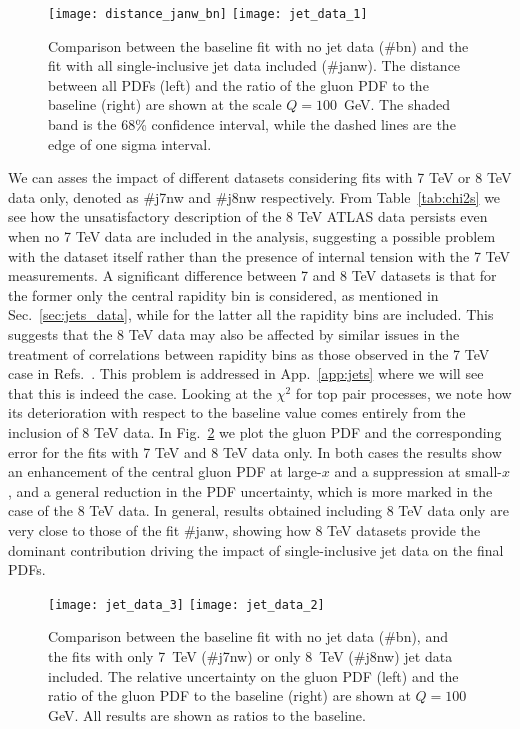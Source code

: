 \begin{figure}[!t]
    \centering
    \texttt{[image: distance\_janw\_bn]}
    \texttt{[image: jet\_data\_1]}\\
    \caption{ Comparison between the baseline fit with no jet data  (\#bn)
      and the fit with all single-inclusive jet data included (\#janw).
      The distance between all PDFs
      (left) and the ratio of the gluon PDF to the baseline (right) are shown at the scale
      $Q=100$~GeV. The shaded band is the 68\% confidence interval,
      while the dashed lines are the edge of one sigma interval.}
    \label{fig:jet_data_total}
\end{figure}

%
We can asses the impact of different datasets considering fits with 7 TeV or 8 TeV data only, denoted as \#j7nw and \#j8nw
respectively. From Table~\ref{tab:chi2s} we see how the unsatisfactory description of the 8 TeV ATLAS data persists even when 
no 7 TeV data are included in the analysis, suggesting a possible problem with the dataset itself rather than 
the presence of internal tension with the 7 TeV measurements.
A significant difference between 7 and 8 TeV datasets is that for the former only the central rapidity bin is considered,
as mentioned in Sec.~\ref{sec:jets_data}, while for the latter all the rapidity bins are included.
This suggests that the 8 TeV data may also be affected by similar issues in the treatment of correlations 
between rapidity bins as those observed in the 7 TeV case in Refs.~\cite{Ball:2017nwa}. This problem is addressed
in App.~\ref{app:jets} where we will see that this is indeed the case.
%
Looking at the $\chi^2$ for top pair processes, we note how its deterioration with respect to the baseline value comes
entirely from the inclusion of 8 TeV data.
In Fig.~\ref{fig:jet_data_partial}
we plot the gluon PDF and the corresponding error for the fits with 7 TeV and 8 TeV data only. In both cases the results show 
an enhancement of the central gluon PDF at large-$x$ and a suppression at small-$x$, and a general reduction in the 
PDF uncertainty, which is more marked in the case of the 8 TeV data. 
In general, results obtained including 8 TeV data only are very close to those of the fit \#janw, showing
how 8 TeV datasets provide the dominant contribution driving the impact of single-inclusive jet data on the final PDFs.

\begin{figure}[!t]
    \centering
    \texttt{[image: jet\_data\_3]}
    \texttt{[image: jet\_data\_2]}
    \caption{ Comparison between the baseline fit with no jet data
      (\#bn), and the fits with only 7~TeV (\#j7nw) or only 8~TeV (\#j8nw)
      jet data included. The relative uncertainty on the gluon PDF (left)
      and the ratio of the gluon PDF to the baseline (right) are shown at
      $Q=100$ GeV. All results are shown as ratios to the baseline.}
    \label{fig:jet_data_partial}
\end{figure}

